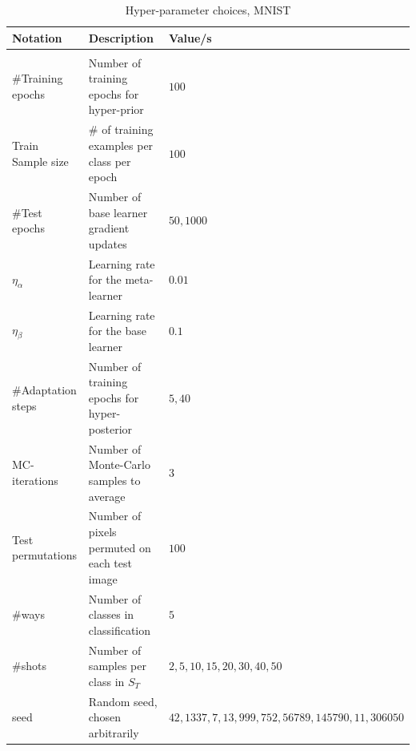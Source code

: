 \documentclass{article} %
\theoremstyle{definition}
\begin{document}
\begin{table}[ht]	
	
	\centering
 \caption{Hyper-parameter choices, MNIST}
	\label{table:hyper-params}
	\begin{tabular}{lll}
		
		Notation   & Description  & Value/s   \\ \hline \\
		\#Training epochs & Number of training epochs for hyper-prior   & $100$      \\
		\midrule
		Train Sample size & \# of training examples per class per epoch   & $100$      \\
		\midrule
		\#Test epochs & Number of base learner gradient updates   & $50,1000$      \\
		\midrule
		$\eta_{\alpha}$  & Learning rate for the meta-learner   & $0.01$      \\
		\midrule
		$\eta_{\beta}$  & Learning rate for the base learner   & $0.1$      \\
		\midrule
		\#Adaptation steps  & Number of training epochs for hyper-posterior   & $5,40$      \\
		\midrule
		MC-iterations & Number of Monte-Carlo samples to average & $3$\\
		\midrule
		Test permutations  & Number of pixels permuted on each test image   & $100$      \\
		\midrule
		\#ways & Number of classes in classification & $5$\\
		\midrule
		\#shots & Number of samples per class in $S_T$ & $2,5,10,15,20,30,40,50$\\
		\midrule
		seed & Random seed, chosen arbitrarily & $42,1337,7,13,999,752,56789,145790,11,306050$\\
		\bottomrule
	\end{tabular}
\end{table}
\end{document}
